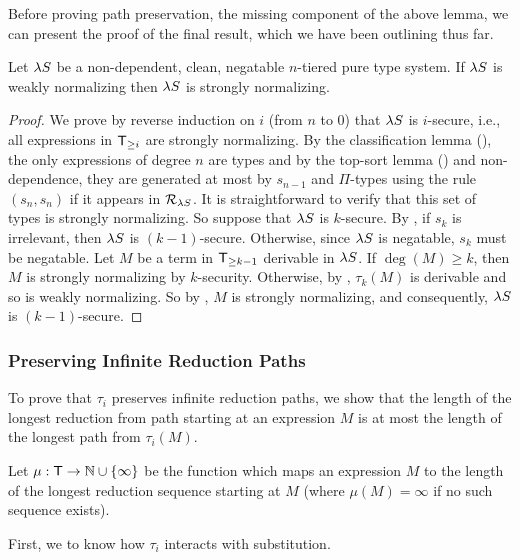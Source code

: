 \documentclass{article}
\begin{document}
Before proving path preservation, the missing component of the above lemma, we can present the proof of the final result, which we have been outlining thus far.

\begin{theorem}
Let $\lambda S$ be a non-dependent, clean, negatable $n$-tiered pure type system.
If $\lambda S$ is weakly normalizing then $\lambda S$ is strongly normalizing.
\end{theorem}

\begin{proof}
We prove by reverse induction on $i$ (from $n$ to $0$) that $\lambda S$ is $i$-secure, i.e., all expressions in $\mathsf{T}_{\geq i}$ are strongly normalizing.
By the classification lemma (), the only expressions of degree $n$ are types and by the top-sort lemma () and non-dependence, they are generated at most by $s_{n - 1}$ and $\Pi$-types using the rule $(s_n, s_n)$ if it appears in $\mathcal R_{\lambda S}$.
It is straightforward to verify that this set of types is strongly normalizing.
So suppose that $\lambda S$ is $k$-secure.
By , if $s_k$ is irrelevant, then $\lambda S$ is $(k - 1)$-secure.
Otherwise, since $\lambda S$ is negatable, $s_k$ must be negatable.
Let $M$ be a term in $\mathsf{T}_{\geq k - 1}$ derivable in $\lambda S$.
If $\deg(M) \geq k$, then $M$ is strongly normalizing by $k$-security.
Otherwise, by , $\tau_k(M)$ is derivable and so is weakly normalizing.
So by , $M$ is strongly normalizing, and consequently, $\lambda S$ is $(k - 1)$-secure.
\end{proof}

\subsubsection*{Preserving Infinite Reduction Paths}

To prove that $\tau_i$ preserves infinite reduction paths, we show that the length of the longest reduction from path starting at an expression $M$ is at most the length of the longest path from $\tau_i(M)$.

\begin{definition}
Let $\mu: \mathsf{T} \to \mathbb {N} \cup \{\infty\}$ be the function which maps an expression $M$ to the length of the longest reduction sequence starting at $M$ (where $\mu(M) = \infty$ if no such sequence exists).
\end{definition}

First, we to know how $\tau_i$ interacts with substitution.
\end{document}
